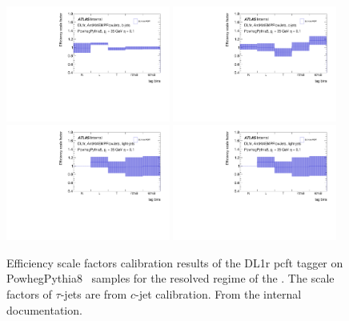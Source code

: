 \begin{figure}
    \centering
    \includegraphics[width=0.48\textwidth]{Images/VH/Obj/FTAGCalib/ftagres/DL1r_AntiKt4EMPFlowJets_BTagging201903_Continuous2D_B_410470_30_eta01.pdf}
    \includegraphics[width=0.48\textwidth]{Images/VH/Obj/FTAGCalib/ftagres/DL1r_AntiKt4EMPFlowJets_BTagging201903_Continuous2D_C_410470_30_eta01.pdf}\\
    \includegraphics[width=0.48\textwidth]{Images/VH/Obj/FTAGCalib/ftagres/DL1r_AntiKt4EMPFlowJets_BTagging201903_Continuous2D_Light_410470_30_eta01.pdf}
    \includegraphics[width=0.48\textwidth]{Images/VH/Obj/FTAGCalib/ftagres/DL1r_AntiKt4EMPFlowJets_BTagging201903_Continuous2D_Light_410470_30_eta01.pdf}
    \caption{Efficiency scale factors calibration results of the DL1r \gls{pcft} tagger on PowhegPythia8 \ttb\ samples for the resolved regime of the \vhbc. The scale factors of $\tau$-jets are from $c$-jet calibration. From the internal documentation.
    }
    \label{appfig:FTAG_calibration_resolved}
\end{figure}
   
